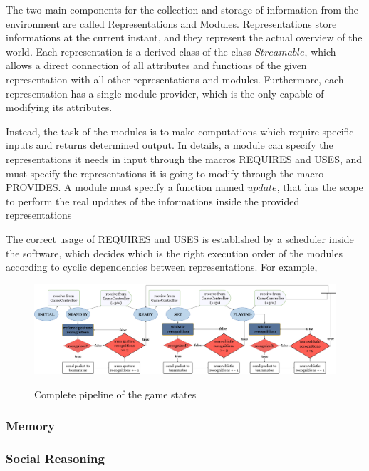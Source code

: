 \documentclass[a4paper, onecolumn, 12pt]{article}
\begin{document}
The two main components for the collection and storage of information from the environment
are called Representations and Modules.
Representations store informations at the current instant, and they represent the actual overview
of the world. Each representation is a derived class of the class $Streamable$, which allows a 
direct connection of all attributes and functions of the given representation with all other
representations and modules. Furthermore, each representation has a single module provider, which
is the only capable of modifying its attributes.

Instead, the task of the modules is to make computations which require specific inputs and returns
determined output. In details, a module can specify the representations it needs in input through
the macros REQUIRES and USES, and must specify the representations it is going to modify through
the macro PROVIDES. A module must specify a function named $update$, that has the scope to 
perform the real updates of the informations inside the provided representations

The correct usage of REQUIRES and USES is established by a scheduler inside the software, which decides 
which is the right execution order of the modules according to cyclic dependencies between representations.
For example,

\begin{figure}
    \centering
    \includegraphics[width=0.9\linewidth]{assets/flowchart.png}
    \label{fig:flowchart}
    \caption{Complete pipeline of the game states}
\end{figure}

\subsubsection{Memory}


\subsubsection{Social Reasoning}
\end{document}
